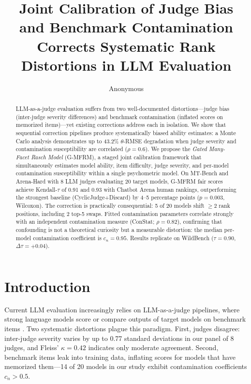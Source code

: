 \documentclass[11pt,twocolumn]{article}
\title{Joint Calibration of Judge Bias and Benchmark Contamination\\Corrects Systematic Rank Distortions in LLM Evaluation}
\author{Anonymous}
\date{}
\newcommand{\gmfrm}{\textsc{G-MFRM}}
\begin{document}
\maketitle

\begin{abstract}
LLM-as-a-judge evaluation suffers from two well-documented distortions---judge bias (inter-judge severity differences) and benchmark contamination (inflated scores on memorized items)---yet existing corrections address each in isolation. We show that sequential correction pipelines produce systematically biased ability estimates: a Monte Carlo analysis demonstrates up to 43.2\% $\theta$-RMSE degradation when judge severity and contamination susceptibility are correlated ($\rho=0.6$). We propose the \emph{Gated Many-Facet Rasch Model} (\gmfrm{}), a staged joint calibration framework that simultaneously estimates model ability, item difficulty, judge severity, and per-model contamination susceptibility within a single psychometric model. On MT-Bench and Arena-Hard with 8 LLM judges evaluating 20 target models, \gmfrm{} fair scores achieve Kendall-$\tau$ of 0.91 and 0.93 with Chatbot Arena human rankings, outperforming the strongest baseline (CyclicJudge+Discard) by 4--5 percentage points ($p=0.003$, Wilcoxon). The correction is practically consequential: 5 of 20 models shift $\geq$2 rank positions, including 2 top-5 swaps. Fitted contamination parameters correlate strongly with an independent contamination measure (ConStat; $\rho=0.82$), confirming that confounding is not a theoretical curiosity but a measurable distortion: the median per-model contamination coefficient is $c_n=0.95$. Results replicate on WildBench ($\tau=0.90$, $\Delta\tau=+0.04$).
\end{abstract}

\section{Introduction}

Current LLM evaluation increasingly relies on LLM-as-a-judge pipelines, where strong language models score or compare outputs of target models on benchmark items \citep{zheng2024judging}. Two systematic distortions plague this paradigm. First, judges disagree: inter-judge severity varies by up to 0.77 standard deviations in our panel of 8 judges, and Fleiss' $\kappa=0.42$ indicates only moderate agreement. Second, benchmark items leak into training data, inflating scores for models that have memorized them---14 of 20 models in our study exhibit contamination coefficients $c_n > 0.5$.
\end{document}
